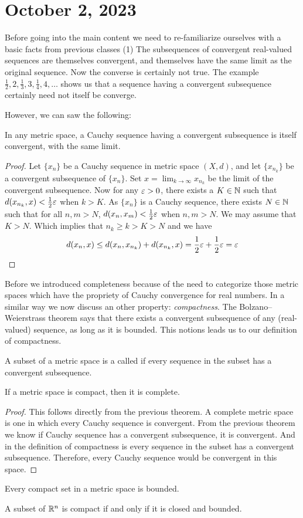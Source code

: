 \newpage
\section{October 2, 2023}
Before going into the main content we need to re-familiarize ourselves with a basic facts from previous classes (1) The subsequences of convergent real-valued sequences are themselves convergent, and themselves have the same limit as the original sequence. Now the converse is certainly not true. The example 
$\frac{1}{2}, 2, \frac{1}{3}, 3, \frac{1}{4}, 4, \dots $ shows us that a sequence having a convergent subsequence certainly need not itself be converge.

However, we can saw the following:
\begin{theorem}
    In any metric space, a Cauchy sequence having a convergent subsequence is itself convergent, with the same limit. 
\end{theorem}
\begin{proof}
    Let $\{ x_n\}$ be a Cauchy sequence in metric space $(X,d)$, and let $\{ x_{n_k} \}$ be a convergent subsequence of $\{ x_n\}$.
    Set $ x = \lim_{k \to \infty} x_{n_k}$ be the limit of the convergent subsequence. 
    Now for any $\varepsilon > 0$, there exists a $K \in \mathbb N$ such that $d(x_{n_k}, x) < \frac{1}{2}\varepsilon$ when $k > K$. 
    As  $\{ x_n\}$ is a Cauchy sequence, there exists $N \in \mathbb N$ such that for all $n,m > N$, $d(x_n, x_m) < \frac{1}{2} \varepsilon$ when $n,m > N$. We may assume that $K >N$. Which implies that $n_k \geq k > K > N$ and we have
    $$
    d(x_n, x) \leq d(x_n, x_{n_k}) + d(x_{n_k}, x) = \frac{1}{2} \varepsilon + \frac{1}{2} \varepsilon = \varepsilon
    $$
\end{proof}
Before we introduced completeness because of the need to categorize those metric spaces which have the propriety of Cauchy convergence for real numbers. In a similar way we now discuss an other property: \textit{compactness}. The Bolzano–Weierstrass theorem says that there exists a convergent subsequence of any (real-valued) sequence, as long as it is bounded. This notions leads us to our definition of compactness. 
\begin{definition}
    A subset of a metric space is a called  if every sequence in the subset has a convergent subsequence.  
\end{definition}

\begin{theorem}
    If a metric space is compact, then it is complete.
\end{theorem}
\begin{proof}
    This follows directly from the previous theorem. A complete metric space is one in which every Cauchy sequence is convergent. From the previous theorem we know if Cauchy sequence has a convergent subsequence, it is convergent. And in the definition of compactness is every sequence in the subset has a convergent subsequence. Therefore, every Cauchy sequence would be convergent in this space.
\end{proof}

\begin{theorem}
    Every compact set in a metric space is bounded. 
\end{theorem}
\begin{theorem}
    A subset of $\mathbb R^n$ is compact if and only if it is closed and bounded.
\end{theorem}

 
